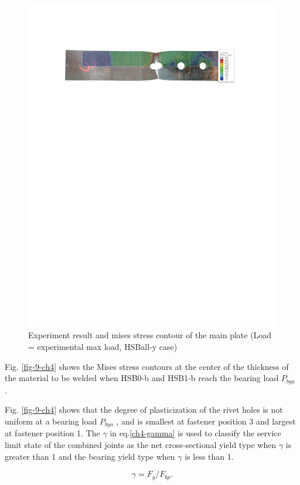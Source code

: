 \begin{figure}[htbp]
\begin{minipage}[t]{1\textwidth}
    \includegraphics{imgs/ch4/ch4fig10.pdf}
    \caption{Experiment result and mises stress contour of the main plate (Load = experimental max load, HSBall-y case)}
    \label{ch4fig10}
    \end{minipage}
\end{figure}


Fig. \ref{fig-9-ch4} shows the Mises stress contours at the center of the thickness of the material to be welded when HSB0-b and HSB1-b reach the bearing load $P_{bya}$ .

Fig. \ref{fig-9-ch4} shows that the degree of plasticization of the rivet holes is not uniform at a bearing load $P_{bya}$ , and is smallest at fastener position 3 and largest at fastener position 1. The $\gamma$ in eq.\ref{ch4-gamma} is used to classify the service limit state of the combined joints as the net cross-sectional yield type when $\gamma$ is greater than 1 and the bearing yield type when $\gamma$ is less than 1. 

\begin{equation}\label{ch4-gamma}
    \gamma = F_y/F_{bp}.
\end{equation}



